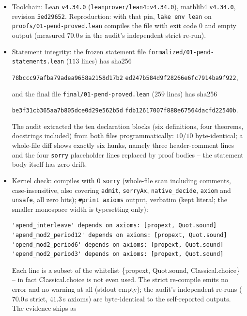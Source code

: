 \documentclass[11pt]{article}
\theoremstyle{definition}
\begin{document}
\begin{itemize}
\item Toolchain: Lean \texttt{v4.34.0} (\texttt{leanprover/lean4:v4.34.0}),
mathlib4 \texttt{v4.34.0}, revision \texttt{5ed29652}. Reproduction: with that
pin, \texttt{lake env lean} on \texttt{proofs/01-pend-proved.lean} compiles the
file with exit code $0$ and empty output (measured $70.0$\,s in the audit's
independent strict re-run).
\item Statement integrity: the frozen statement file\newline
\texttt{formalized/01-pend-statements.lean} ($113$ lines) has sha256
\begin{center}
\texttt{78bccc97afba79adea9658a2158d17b2}\allowbreak
\texttt{ed247b584d9f28266e6fc7914ba9f922},
\end{center}
and the final file \texttt{final/01-pend-proved.lean} ($259$ lines) has sha256
\begin{center}
\texttt{be3f31cb365aa7b805dce0d29e562b5d}\allowbreak
\texttt{fdb12617007f888e67564dacfd22540b}.
\end{center}
The audit extracted the ten declaration blocks (six definitions, four theorems,
docstrings included) from both files programmatically: $10/10$ byte-identical;
a whole-file diff shows exactly six hunks, namely three header-comment lines and
the four \texttt{sorry} placeholder lines replaced by proof bodies -- the
statement body itself has zero drift.
\item Kernel check: compiles with $0$ \texttt{sorry} (whole-file scan including
comments, case-insensitive, also covering \texttt{admit}, \texttt{sorryAx},
\texttt{native\_decide}, \texttt{axiom} and \texttt{unsafe}, all zero hits);
\texttt{\#print axioms} output, verbatim (kept literal; the smaller monospace
width is typesetting only):
\begin{lstlisting}[basicstyle=\ttfamily\footnotesize,frame=none]
'apend_interleave' depends on axioms: [propext, Quot.sound]
'apend_mod2_period12' depends on axioms: [propext, Quot.sound]
'opend_mod2_period6' depends on axioms: [propext, Quot.sound]
'epend_mod2_period3' depends on axioms: [propext, Quot.sound]
\end{lstlisting}
Each line is a subset of the whitelist \{propext, Quot.sound,
Classical.choice\} -- in fact Classical.choice is not even used. The strict
re-compile emits no error and no warning at all (stdout empty); the audit's
independent re-runs ($70.0$\,s strict, $41.3$\,s axioms) are byte-identical to
the self-reported outputs. The evidence ships as

\end{itemize}
\end{document}

